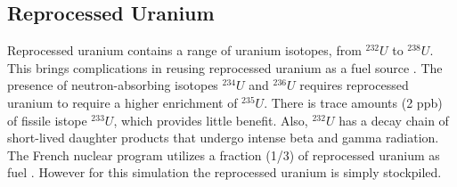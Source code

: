 \subsection{Reprocessed Uranium}
Reprocessed uranium contains a range of uranium isotopes, from $^{232}U$ to $^{238}U$.
This brings complications in reusing reprocessed uranium as a fuel source \cite{IAEA_management_2007}.
The presence of neutron-absorbing isotopes $^{234}U$ and $^{236}U$ requires reprocessed uranium
to require a higher enrichment of $^{235}U$. There is trace amounts (2 ppb) of fissile istope $^{233}U$,
which provides little benefit.  
Also, $^{232}U$ has a decay chain of short-lived
daughter products that undergo intense beta and gamma radiation.
The French nuclear program utilizes a fraction (1/3) of reprocessed uranium as fuel \cite{IAEA_management_2007}.
However for this simulation the reprocessed uranium is simply stockpiled.


